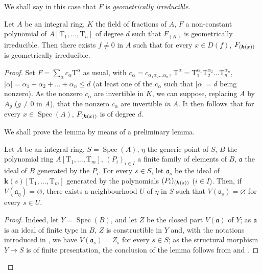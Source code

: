 We shall say in this case that $F$ is \emph{geometrically irreducible}.

\begin{lemma}[9.7.5]
\label{IV.9.7.5}
Let $A$ be an integral ring, $K$ the field of fractions of $A$, $F$ a non-constant polynomial of $A[\mathrm{T}_1,\ldots,\mathrm{T}_n]$ of degree $d$ such that $F_{(K)}$ is geometrically irreducible.
Then there exists $f\neq 0$ in $A$ such that for every $x\in D(f)$, $F_{(\boldsymbol{k}(x))}$ is geometrically irreducible.
\end{lemma}

\begin{proof}
Set $F=\sum_\alpha c_\alpha \mathrm{T}^\alpha$ as usual, with $c_\alpha=c_{\alpha_1\alpha_2\ldots\alpha_n}$, $\mathrm{T}^\alpha=\mathrm{T}_1^{\alpha_1}\mathrm{T}_2^{\alpha_2}\ldots\mathrm{T}_n^{\alpha_n}$, $|\alpha|=\alpha_1+\alpha_2+\ldots+\alpha_n\leqslant d$ (at least one of the $c_\alpha$ such that $|\alpha|=d$ being nonzero).
As the nonzero $c_\alpha$ are invertible in $K$, we can suppose, replacing $A$ by $A_g$ ($g\neq 0$ in $A$), that the nonzero $c_\alpha$ are invertible \emph{in} $A$.
It then follows that for every $x\in\operatorname{Spec}(A)$, $F_{(\boldsymbol{k}(x))}$ is of degree $d$.

We shall prove the lemma by means of a preliminary lemma.

\begin{lemma}[9.7.5.1]
\label{IV.9.7.5.1}
Let $A$ be an integral ring, $S=\operatorname{Spec}(A)$, $\eta$ the generic point of $S$, $B$ the polynomial ring $A[\mathrm{T}_1,\ldots,\mathrm{T}_m]$, $(P_i)_{i\in I}$ a finite family of elements of $B$, $\mathfrak{a}$ the ideal of $B$ generated by the $P_i$.
For every $s\in S$, let $\mathfrak{a}_s$ be the ideal of $\boldsymbol{k}(s)[\mathrm{T}_1,\ldots,\mathrm{T}_m]$ generated by the polynomials $(P_i)_{(\boldsymbol{k}(s))}$ ($i\in I$).
Then, if $V(\mathfrak{a}_\eta)=\varnothing$, there exists a neighbourhood $U$ of $\eta$ in $S$ such that $V(\mathfrak{a}_s)=\varnothing$ for every $s\in U$.
\end{lemma}

\begin{proof}
Indeed, let $Y=\operatorname{Spec}(B)$, and let $Z$ be the closed part $V(\mathfrak{a})$ of $Y$; as $\mathfrak{a}$ is an ideal of finite type in $B$, $Z$ is constructible in $Y$  and, with the notations introduced in , we have $V(\mathfrak{a}_s)=Z_s$ for every $s\in S$; as the structural morphism $Y\to S$ is of finite presentation, the conclusion of the lemma follows from  and .
\end{proof}


\end{proof}
